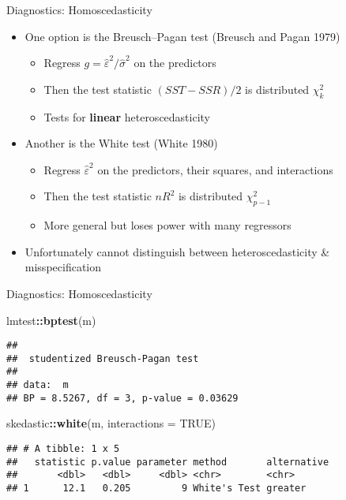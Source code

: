 \documentclass[
  ignorenonframetext,
]{beamer}
\newenvironment{Shaded}{\begin{snugshade}}{\end{snugshade}}
\newcommand{\AttributeTok}[1]{\textcolor[rgb]{0.13,0.29,0.53}{#1}}
\newcommand{\ConstantTok}[1]{\textcolor[rgb]{0.56,0.35,0.01}{#1}}
\newcommand{\FunctionTok}[1]{\textcolor[rgb]{0.13,0.29,0.53}{\textbf{#1}}}
\newcommand{\NormalTok}[1]{#1}
\newcommand{\SpecialCharTok}[1]{\textcolor[rgb]{0.81,0.36,0.00}{\textbf{#1}}}
\providecommand{\tightlist}{%
  \setlength{\itemsep}{0pt}\setlength{\parskip}{0pt}}
\newcommand{\setsep}{\setlength{\itemsep}{3pt}}
\newcommand{\setskip}{\setlength{\parskip}{3pt}}
\renewcommand{\tightlist}{\setsep\setskip}
\begin{document}
\begin{frame}{Diagnostics: Homoscedasticity}
\label{diagnostics-homoscedasticity-4}
\begin{itemize}[<+->]
\tightlist
\item
  One option is the Breusch--Pagan test (Breusch and Pagan 1979)

  \begin{itemize}[<+->]
  \tightlist
  \item
    Regress \(g = \hat{\varepsilon}^2 / \hat{\sigma}^2\) on the predictors
  \item
    Then the test statistic \((SST - SSR) / 2\) is distributed \(\chi_k^2\)
  \item
    Tests for \textbf{linear} heteroscedasticity
  \end{itemize}
\item
  Another is the White test (White 1980)

  \begin{itemize}[<+->]
  \tightlist
  \item
    Regress \(\hat{\varepsilon}^2\) on the predictors, their squares, and interactions
  \item
    Then the test statistic \(nR^2\) is distributed \(\chi_{p-1}^2\)
  \item
    More general but loses power with many regressors
  \end{itemize}
\item
  Unfortunately cannot distinguish between heteroscedasticity \& misspecification
\end{itemize}
\end{frame}

\begin{frame}[fragile]{Diagnostics: Homoscedasticity}
\label{diagnostics-homoscedasticity-5}
\begin{Shaded}
\begin{Highlighting}[]
\NormalTok{lmtest}\SpecialCharTok{::}\FunctionTok{bptest}\NormalTok{(m)}
\end{Highlighting}
\end{Shaded}

\begin{verbatim}
## 
##  studentized Breusch-Pagan test
## 
## data:  m
## BP = 8.5267, df = 3, p-value = 0.03629
\end{verbatim}

\begin{Shaded}
\begin{Highlighting}[]
\NormalTok{skedastic}\SpecialCharTok{::}\FunctionTok{white}\NormalTok{(m, }\AttributeTok{interactions =} \ConstantTok{TRUE}\NormalTok{)}
\end{Highlighting}
\end{Shaded}

\begin{verbatim}
## # A tibble: 1 x 5
##   statistic p.value parameter method       alternative
##       <dbl>   <dbl>     <dbl> <chr>        <chr>      
## 1      12.1   0.205         9 White's Test greater
\end{verbatim}
\end{frame}
\end{document}
